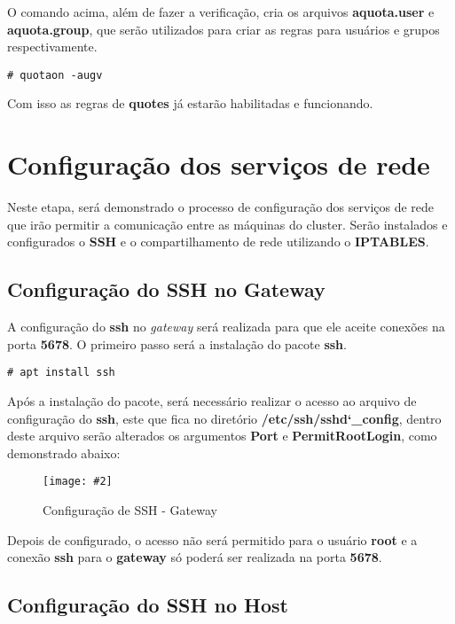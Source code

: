 \documentclass[
	12pt,				%
	openany,			%
	a4paper,			%
	chapter=TITLE,		%
	section=TITLE,		%
	english,
	brazil				%
]{abntex2}
\newcommand{\includeImage}[3] {

\begin{figure}[H]
 	 \centering
  		\texttt{[image: \#2]}
  	\caption{#3}
\end{figure}

}
\begin{document}
O comando acima, além de fazer a verificação, cria os arquivos \textbf{aquota.user} e \textbf{aquota.group}, que serão utilizados para criar as regras para usuários e grupos respectivamente.
\begin{lstlisting}
# quotaon -augv
\end{lstlisting}

Com isso as regras de \textbf{quotes} já estarão habilitadas e funcionando.

\section{Configuração dos serviços de rede}

Neste etapa, será demonstrado o processo de configuração dos serviços de rede que irão permitir a comunicação entre as máquinas do cluster. Serão instalados e configurados o \textbf{SSH} e o compartilhamento de rede utilizando o \textbf{IPTABLES}.

\subsection{Configuração do SSH no Gateway}

A configuração do \textbf{ssh} no \textit{gateway} será realizada para que ele aceite conexões na porta \textbf{5678}. O primeiro passo será a instalação do pacote \textbf{ssh}.

\begin{lstlisting}
# apt install ssh
\end{lstlisting}

Após a instalação do pacote, será necessário realizar o acesso ao arquivo de configuração do \textbf{ssh}, este que fica no diretório \textbf{/etc/ssh/sshd\char`_config}, dentro deste arquivo serão alterados os argumentos \textbf{Port} e \textbf{PermitRootLogin}, como demonstrado abaixo:

\includeImage{0.7}{imgs/4_configuracao_servicos_rede/1_gateway_1.png}{Configuração de SSH - Gateway}

Depois de configurado, o acesso não será permitido para o usuário \textbf{root} e a conexão \textbf{ssh} para o \textbf{gateway} só poderá ser realizada na porta \textbf{5678}.

\subsection{Configuração do SSH no Host}
\end{document}
